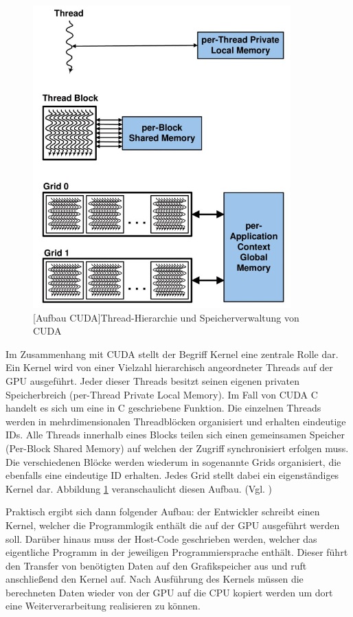 \documentclass[times, 10pt,twocolumn]{article}
\begin{document}
 \begin{figure}[!ht]
	\centering
	\includegraphics[width=0.7\linewidth]{image/cuda.png}
	[Aufbau CUDA]{Thread-Hierarchie und Speicherverwaltung von CUDA \cite{CUDA.2015}}
	\label{fig:cudaAufbau}
\end{figure}

Im Zusammenhang mit CUDA stellt der Begriff Kernel eine zentrale Rolle dar. Ein Kernel wird von einer Vielzahl hierarchisch angeordneter Threads auf der GPU ausgeführt. Jeder dieser Threads besitzt seinen eigenen privaten Speicherbreich (per-Thread Private Local Memory). Im Fall von CUDA C handelt es sich um eine in C geschriebene Funktion. Die einzelnen Threads werden in mehrdimensionalen Threadblöcken organisiert und erhalten eindeutige IDs. Alle Threads innerhalb eines Blocks teilen sich einen gemeinsamen Speicher (Per-Block Shared Memory) auf welchen der Zugriff synchronisiert erfolgen muss. Die verschiedenen Blöcke werden wiederum in sogenannte Grids  organisiert, die ebenfalls eine eindeutige ID erhalten. Jedes Grid stellt dabei ein eigenständiges Kernel dar. Abbildung \ref{fig:cudaAufbau} veranschaulicht diesen Aufbau. (Vgl. \cite{CUDA.2015})

Praktisch ergibt sich dann folgender Aufbau: der Entwickler schreibt einen Kernel, welcher die Programmlogik enthält die auf der GPU ausgeführt werden soll. Darüber hinaus muss der Host-Code geschrieben werden, welcher das eigentliche Programm in der jeweiligen Programmiersprache enthält. Dieser führt den Transfer von benötigten Daten auf den Grafikspeicher aus und ruft anschließend den Kernel auf. Nach Ausführung des Kernels müssen die berechneten Daten wieder von der GPU auf die CPU kopiert werden um dort eine Weiterverarbeitung realisieren zu können.
\end{document}
